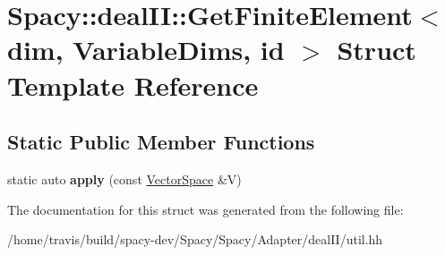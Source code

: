 \hypertarget{structSpacy_1_1dealII_1_1GetFiniteElement}{\section{Spacy\-:\-:deal\-I\-I\-:\-:Get\-Finite\-Element$<$ dim, Variable\-Dims, id $>$ Struct Template Reference}
\label{structSpacy_1_1dealII_1_1GetFiniteElement}
}
\subsection*{Static Public Member Functions}
\begin{DoxyCompactItemize}
\item 
\hypertarget{structSpacy_1_1dealII_1_1GetFiniteElement_af48bb4def16a6ca29f4f72decfa08077}{static auto {\bfseries apply} (const \hyperlink{classSpacy_1_1VectorSpace}{Vector\-Space} \&V)}\label{structSpacy_1_1dealII_1_1GetFiniteElement_af48bb4def16a6ca29f4f72decfa08077}

\end{DoxyCompactItemize}


The documentation for this struct was generated from the following file\-:\begin{DoxyCompactItemize}
\item 
/home/travis/build/spacy-\/dev/\-Spacy/\-Spacy/\-Adapter/deal\-I\-I/util.\-hh\end{DoxyCompactItemize}
